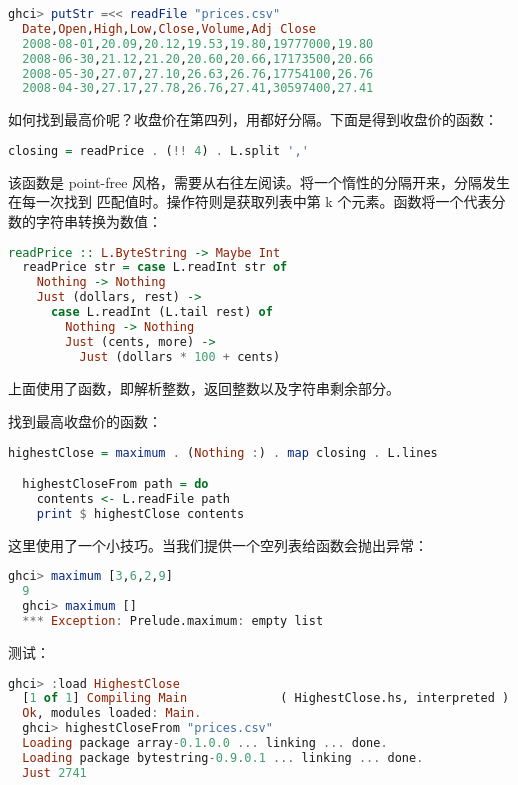 \documentclass[./main.tex]{subfiles}
\begin{document}
\begin{lstlisting}[language=Haskell]
  ghci> putStr =<< readFile "prices.csv"
  Date,Open,High,Low,Close,Volume,Adj Close
  2008-08-01,20.09,20.12,19.53,19.80,19777000,19.80
  2008-06-30,21.12,21.20,20.60,20.66,17173500,20.66
  2008-05-30,27.07,27.10,26.63,26.76,17754100,26.76
  2008-04-30,27.17,27.78,26.76,27.41,30597400,27.41
\end{lstlisting}

如何找到最高价呢？收盘价在第四列，用都好分隔。下面是得到收盘价的函数：

\begin{lstlisting}[language=Haskell]
  closing = readPrice . (!! 4) . L.split ','
\end{lstlisting}

该函数是 point-free 风格，需要从右往左阅读。将一个惰性的分隔开来，分隔发生在每一次找到
匹配值时。\acode{(!!)}操作符则是获取列表中第 k 个元素。函数将一个代表分数的字符串转换为数值：

\begin{lstlisting}[language=Haskell]
  readPrice :: L.ByteString -> Maybe Int
  readPrice str = case L.readInt str of
    Nothing -> Nothing
    Just (dollars, rest) ->
      case L.readInt (L.tail rest) of
        Nothing -> Nothing
        Just (cents, more) ->
          Just (dollars * 100 + cents)
\end{lstlisting}

上面使用了函数，即解析整数，返回整数以及字符串剩余部分。

找到最高收盘价的函数：

\begin{lstlisting}[language=Haskell]
  highestClose = maximum . (Nothing :) . map closing . L.lines

  highestCloseFrom path = do
    contents <- L.readFile path
    print $ highestClose contents
\end{lstlisting}

这里使用了一个小技巧。当我们提供一个空列表给函数会抛出异常：

\begin{lstlisting}[language=Haskell]
  ghci> maximum [3,6,2,9]
  9
  ghci> maximum []
  *** Exception: Prelude.maximum: empty list
\end{lstlisting}

测试：

\begin{lstlisting}[language=Haskell]
  ghci> :load HighestClose
  [1 of 1] Compiling Main             ( HighestClose.hs, interpreted )
  Ok, modules loaded: Main.
  ghci> highestCloseFrom "prices.csv"
  Loading package array-0.1.0.0 ... linking ... done.
  Loading package bytestring-0.9.0.1 ... linking ... done.
  Just 2741
\end{lstlisting}
\end{document}
